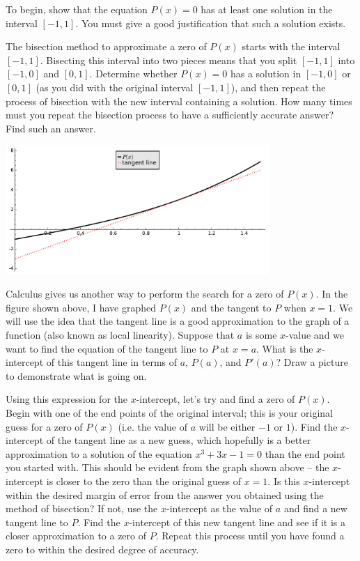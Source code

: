 \documentclass
[justified,nohyper]
{tufte-handout}
\theoremstyle{mydef}
\begin{document}
To begin, show that the equation $P(x)=0$ has at least one solution in the interval $[-1,1]$. You must give a good justification that such a solution exists.

The bisection method to approximate a zero of $P(x)$ starts with the interval $[-1,1]$. Bisecting this interval into two pieces means that you split $[-1,1]$ into $[-1,0]$ and $[0,1]$. Determine whether $P(x)=0$ has a solution in $[-1,0]$ or $[0,1]$ (as you did with the original interval $[-1,1]$), and then repeat the process of bisection with the new interval containing a solution. How many times must you repeat the bisection process to have a sufficiently accurate answer? Find such an answer.

\newpage

\includegraphics[width=10cm]{p_of_x.pdf}

Calculus gives us another way to perform the search for a zero of $P(x)$. In the figure shown above, I have graphed $P(x)$ and the tangent to $P$ when $x=1$. We will use the idea that the tangent line is a good approximation to the graph of a function (also known as local linearity). Suppose that $a$ is some $x$-value and we want to find the equation of the tangent line to $P$ at $x=a$. What is the $x$-intercept of this tangent line in terms of $a$, $P(a)$, and $P'(a)$? Draw a picture to demonstrate what is going on.

Using this expression for the $x$-intercept, let's try and find a zero of $P(x)$. Begin with one of the end points of the original interval; this is your original guess for a zero of $P(x)$ (i.e. the value of $a$ will be either $-1$ or $1$). Find the $x$-intercept of the tangent line as a new guess, which hopefully is a better approximation to a solution of the equation $x^3+3x-1=0$ than the end point you started with. This should be evident from the graph shown above -- the $x$-intercept is closer to the zero than the original guess of $x=1$. Is this $x$-intercept within the desired margin of error from the answer you obtained using the method of bisection? If not, use the $x$-intercept as the value of $a$ and find a new tangent line to $P$. Find the $x$-intercept of this new tangent line and see if it is a closer approximation to a zero of $P$. Repeat this process until you have found a zero to within the desired degree of accuracy.
\end{document}
